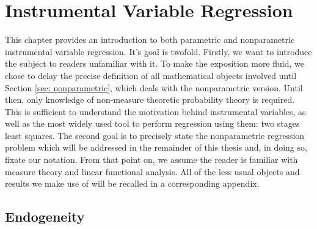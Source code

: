 \chapter{Instrumental Variable Regression}

This chapter provides an introduction to both parametric and nonparametric instrumental variable regression.
It's goal is twofold.
Firstly, we want to introduce the subject to readers unfamiliar with it.
To make the exposition more fluid, we chose to delay the precise definition of all mathematical objects involved until Section \ref{sec: nonparametric}, which deals with the nonparametric version.
Until then, only knowledge of non-measure theoretic probability theory is required.
This is sufficient to understand the motivation behind instrumental variables, as well as the most widely used tool to perform regression using them: two stages least squares.
The second goal is to precisely state the nonparametric regression problem which will be addressed in the remainder of this thesis and, in doing so, fixate our notation.
From that point on, we assume the reader is familiar with measure theory and linear functional analysis.
All of the less usual objects and results we make use of will be recalled in a corresponding appendix.

\section{Endogeneity}

